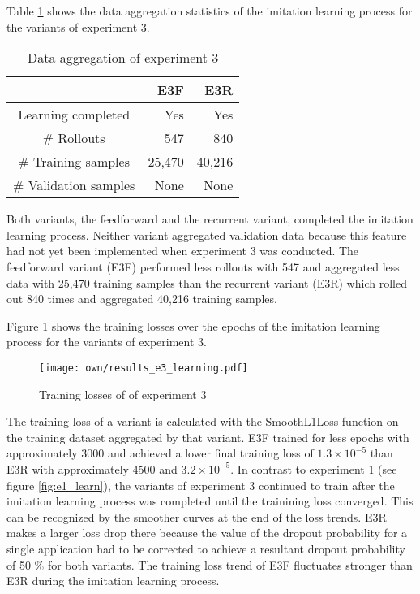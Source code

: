 Table \ref{tab:e3_data} shows
the data aggregation statistics of the imitation learning process for the variants of experiment 3.
\begin{table}[h]
    \caption[
        Data aggregation of experiment 3
    ]{
        Data aggregation of experiment 3
        \label{tab:e3_data}}        
    \centering
    \begin{tabular}{|c|r|r|} 
        \cline{2-3}
        \multicolumn{1}{c|}{}
        &E3F
        &E3R
        \\\hline
        Learning completed
        &Yes
        &Yes
        \\\hline
        \# Rollouts
        &547
        &840
        \\\hline
        \# Training samples
        &25,470
        &40,216
        \\\hline
        \# Validation samples
        &None
        &None
        \\\hline
    \end{tabular}
\end{table}
Both variants, the feedforward and the recurrent variant, completed the imitation learning process.
Neither variant aggregated validation data 
because this feature had not yet been implemented when experiment 3 was conducted.
The feedforward variant (E3F) performed less rollouts with 547
and aggregated less data with 25,470 training samples
than the recurrent variant (E3R) which rolled out 840 times
and aggregated 40,216 training samples.

Figure \ref{fig:e3_learn} shows the 
training losses over the epochs of the imitation learning process for the variants of experiment 3.
\begin{figure}
    \centering
    \texttt{[image: own/results\_e3\_learning.pdf]}
    \caption[
        Training losses of of experiment 3
    ]{
        Training losses of of experiment 3
    \label{fig:e3_learn}}
\end{figure}
The training loss of a variant is calculated with the SmoothL1Loss function
on the training dataset aggregated by that variant.
E3F trained for less epochs with approximately 3000
and achieved a lower final training loss of $1.3\times 10^{-5}$
than E3R with approximately 4500 and $3.2\times 10^{-5}$.
In contrast to experiment 1 (see figure \ref{fig:e1_learn}),
the variants of experiment 3
continued to train
after the imitation learning process was completed 
until the trainining loss converged.
This can be recognized by the smoother curves at the end of the loss trends.
E3R makes a larger loss drop there
because the value of the dropout probability for a single application
had to be corrected to achieve a resultant dropout probability of 50 \% for both variants.
The training loss trend of E3F fluctuates stronger than E3R
during the imitation learning process.


